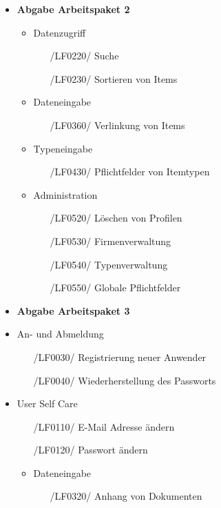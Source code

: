 \documentclass[11pt,a4paper]{report}
\begin{document}
\begin{itemize}
\item
  \textbf{Abgabe Arbeitspaket 2}
  \begin{itemize}
	\item
    	Datenzugriff
    	\begin{itemize}
    	\leftskip=3em
    	\item[/LF0220/] Suche
    	\item[/LF0230/] Sortieren von Items
    	\end{itemize}
	\item
    	Dateneingabe
    	\begin{itemize}
    	\leftskip=3em
    	\item[/LF0360/] Verlinkung von Items
    	\end{itemize}
	\item
	Typeneingabe
	\begin{itemize}
	\item[/LF0430/] Pflichtfelder von Itemtypen
	\end{itemize}
	\item
    	Administration
    	\begin{itemize}
    	\leftskip=3em
    	\item[/LF0520/] Löschen von Profilen
    	\item[/LF0530/] Firmenverwaltung
    	\item[/LF0540/] Typenverwaltung
    	\item[/LF0550/] Globale Pflichtfelder
    	\end{itemize}
  \end{itemize}
\newpage
\item
  \textbf{Abgabe Arbeitspaket 3}
  \item
  		An- und Abmeldung
  		\begin{itemize}
  		\leftskip=3em
  		\item[/LF0030/] Registrierung neuer Anwender
  		\item[/LF0040/] Wiederherstellung des Passworts
  		\end{itemize}
  \item
    	User Self Care
    	\begin{itemize}
    	\leftskip=3em
    	\item[/LF0110/] E-Mail Adresse ändern
    	\item[/LF0120/] Passwort ändern
    	\end{itemize}
  \begin{itemize}
  	\item
    	Dateneingabe
    	\begin{itemize}
    	\leftskip=3em
    	\item[/LF0320/] Anhang von Dokumenten
    	\end{itemize}
  \end{itemize}


\end{itemize}
\end{document}

